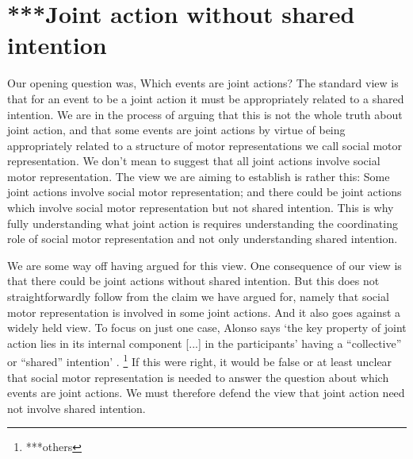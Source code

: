 \documentclass[12pt,\papersize]{extarticle}
\begin{document}
\section{***Joint action without shared intention}
Our opening question was, Which events are joint actions?
The standard view is that for an event to be a joint action it must be appropriately related to a shared intention.
We are in the process of arguing that this is not the whole truth about joint action,
and that some events are joint actions by virtue of being appropriately related to a structure of motor representations we call social motor representation.
We don’t mean to suggest that all joint actions involve social motor representation.
The view we are aiming to establish is rather this: Some joint actions involve social motor representation; and there could be joint actions which involve social motor representation but not shared intention.
This is why 
fully understanding what joint action is requires understanding the coordinating role of social motor representation and not only understanding shared intention.


We are some way off having argued for this view.
One consequence of our view is that there could be joint actions without shared intention. 
But this does not straightforwardly follow from the claim we have argued for, namely that social motor representation is involved in some joint actions.
And it also goes against a widely held view.
To focus on just one case, Alonso says `the key property of joint action lies in its internal component [...] in the participants' having a ``collective'' or ``shared'' intention' \citep[pp.\ 444-5]{alonso_shared_2009}.%
\footnote{
***others
}
If this were right, it would be false or at least unclear that social motor representation is needed to answer the question about which events are joint actions.
We must therefore defend the view that joint action need not involve shared intention.
\end{document}

